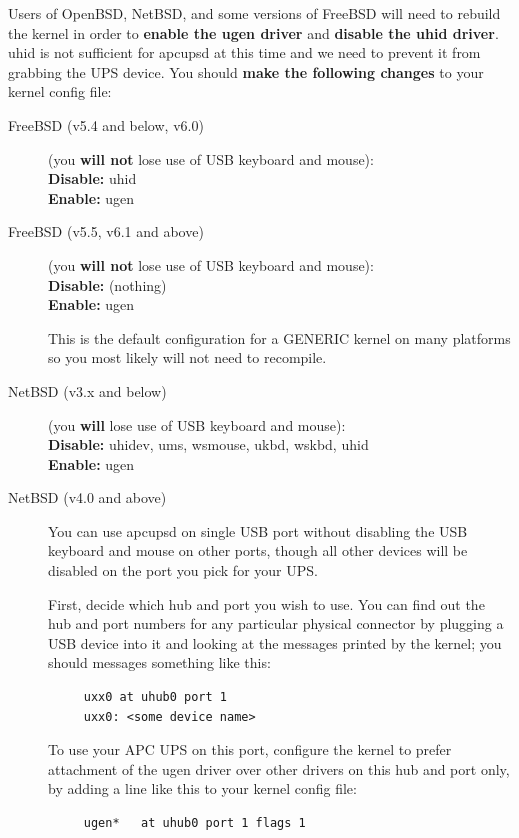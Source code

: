 Users of OpenBSD, NetBSD, and some versions of FreeBSD will need to 
rebuild the kernel in order to {\bf enable the ugen driver} and 
{\bf disable the uhid driver}. uhid is not sufficient for apcupsd at 
this time and we need to prevent it from grabbing the UPS device. You 
should {\bf make the following changes} to your kernel config file:

\begin{description}
\item [FreeBSD (v5.4 and below, v6.0)]
(you {\bf will not} lose use of USB keyboard and mouse):
\\{\bf Disable:} uhid
\\{\bf Enable:} ugen

\item [FreeBSD (v5.5, v6.1 and above)]
(you {\bf will not} lose use of USB keyboard and mouse):
\\{\bf Disable:} (nothing)
\\{\bf Enable:} ugen

This is the default configuration for a GENERIC kernel on many platforms
so you most likely will not need to recompile.

\item [NetBSD (v3.x and below)]
(you {\bf will} lose use of USB keyboard and mouse):
\\{\bf Disable:} uhidev, ums, wsmouse, ukbd, wskbd, uhid  
\\{\bf Enable:} ugen

\item [NetBSD (v4.0 and above)]
You can use apcupsd on single USB port without disabling the USB
keyboard and mouse on other ports, though all other devices will
be disabled on the port you pick for your UPS.

First, decide which hub and port you wish to use. You can
find out the hub and port numbers for any particular physical
connector by plugging a USB device into it and looking at the
messages printed by the kernel; you should messages something
like this:

\begin{verbatim}
     uxx0 at uhub0 port 1
     uxx0: <some device name>
\end{verbatim}

To use your APC UPS on this port, configure the kernel to prefer
attachment of the ugen driver over other drivers on this hub
and port only, by adding a line like this to your kernel config
file:

\begin{verbatim}
     ugen*   at uhub0 port 1 flags 1
\end{verbatim}


\end{description}
